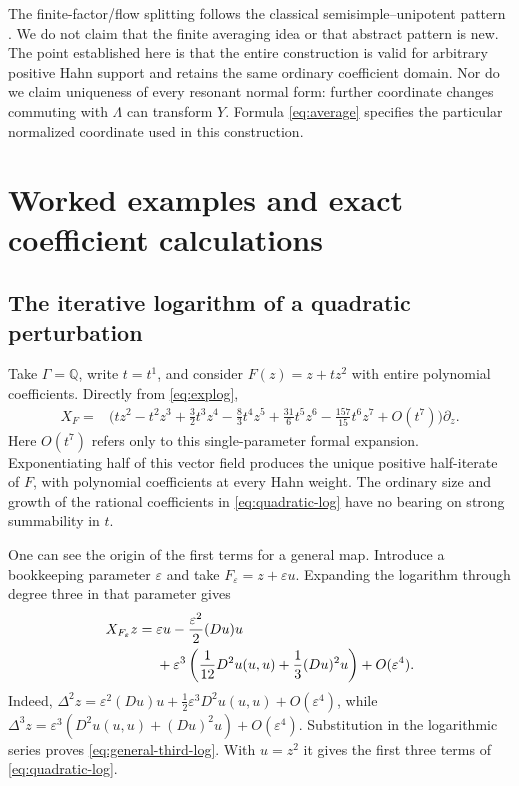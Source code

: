 \documentclass[11pt,letterpaper]{article}
\theoremstyle{definition}
\theoremstyle{remark}
\newcommand{\Q}{\mathbb Q}
\numberwithin{equation}{section}
\begin{document}
The finite-factor/flow splitting follows the classical
semisimple--unipotent pattern \cite{Ribon}. We do not claim that the finite
averaging idea or that abstract pattern is new. The point established here
is that the entire construction is valid for arbitrary positive Hahn support
and retains the same ordinary coefficient domain. Nor do we claim uniqueness
of every resonant normal form: further coordinate changes commuting with
$\Lambda$ can transform $Y$. Formula \eqref{eq:average} specifies the
particular normalized coordinate used in this construction.

\section{Worked examples and exact coefficient calculations}
\label{sec:examples}

\subsection{The iterative logarithm of a quadratic perturbation}
Take $\Gamma=\Q$, write $t=t^1$, and consider $F(z)=z+tz^2$ with entire
polynomial coefficients. Directly from \eqref{eq:explog},
\begin{align}\label{eq:quadratic-log}
 X_F={}&\biggl(tz^2-t^2z^3+\frac32t^3z^4-\frac83t^4z^5
                +\frac{31}{6}t^5z^6-\frac{157}{15}t^6z^7
                +O(t^7)\biggr)\partial_z.
\end{align}
Here $O(t^7)$ refers only to this single-parameter formal expansion.
Exponentiating half of this vector field produces the unique positive
half-iterate of $F$, with polynomial coefficients at every Hahn weight.
The ordinary size and growth of the rational coefficients in
\eqref{eq:quadratic-log} have no bearing on strong summability in $t$.

One can see the origin of the first terms for a general map. Introduce a
bookkeeping parameter $\varepsilon$ and take $F_\varepsilon=z+\varepsilon u$.
Expanding the logarithm through degree three in that parameter gives
\begin{align}\label{eq:general-third-log}
 X_{F_\varepsilon}z={}&\varepsilon u
 -\frac{\varepsilon^2}{2}(Du)u\\
 &+\varepsilon^3\left(\frac1{12}D^2u(u,u)
                    +\frac13(Du)^2u\right)+O(\varepsilon^4).\notag
\end{align}
Indeed, $\Delta^2z=\varepsilon^2(Du)u+
\frac12\varepsilon^3D^2u(u,u)+O(\varepsilon^4)$, while
$\Delta^3z=\varepsilon^3(D^2u(u,u)+(Du)^2u)+O(\varepsilon^4)$.
Substitution in the logarithmic series proves \eqref{eq:general-third-log}.
With $u=z^2$ it gives the first three terms of \eqref{eq:quadratic-log}.
\end{document}
